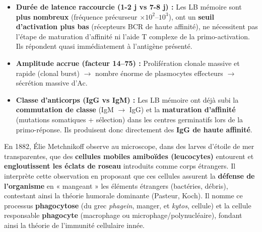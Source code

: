 \documentclass[11pt]{article}
\begin{document}
\begin{corrige}
\begin{enumerate}
\begin{itemize}
        \item \textbf{Durée de latence raccourcie (1-2 j vs 7-8 j) :} Les LB mémoire sont \textbf{plus nombreux} (fréquence précurseur $\times 10^2$--$10^3$), ont un \textbf{seuil d'activation plus bas} (récepteurs BCR de haute affinité), ne nécessitent pas l'étape de maturation d'affinité ni l'aide T complexe de la primo-activation. Ils répondent quasi immédiatement à l'antigène présenté.
        \item \textbf{Amplitude accrue (facteur 14--75) :} Prolifération clonale massive et rapide (clonal burst) $\rightarrow$ nombre énorme de plasmocytes effecteurs $\rightarrow$ sécrétion massive d'Ac.
        \item \textbf{Classe d'anticorps (IgG vs IgM) :} Les LB mémoire ont déjà subi la \textbf{commutation de classe} (IgM $\rightarrow$ IgG) et la \textbf{maturation d'affinité} (mutations somatiques + sélection) dans les centres germinatifs lors de la primo-réponse. Ils produisent donc directement des \textbf{IgG de haute affinité}.
    \end{itemize}
\end{enumerate}
\end{corrige}

\begin{corrige}
En 1882, Élie Metchnikoff observe au microscope, dans des larves d'étoile de mer transparentes, que des \textbf{cellules mobiles amiboïdes (leucocytes)} entourent et \textbf{engloutissent les éclats de roseau} introduits comme corps étrangers. Il interprète cette observation en proposant que ces cellules assurent la \textbf{défense de l'organisme} en « mangeant » les éléments étrangers (bactéries, débris), contestant ainsi la théorie humorale dominante (Pasteur, Koch). Il nomme ce processus \textbf{phagocytose} (du grec \emph{phagein}, manger, et \emph{kytos}, cellule) et la cellule responsable \textbf{phagocyte} (macrophage ou microphage/polynucléaire), fondant ainsi la théorie de l'immunité cellulaire innée.
\end{corrige}
\end{document}
